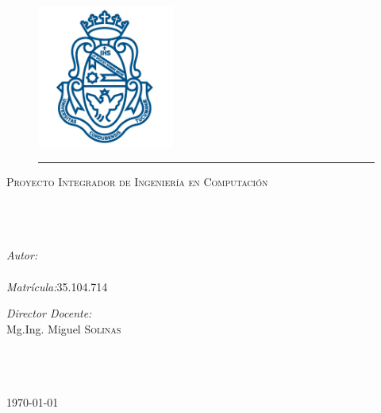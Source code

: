 \documentclass[11pt, oneside]{Thesis} %
\begin{document}
\begin{titlepage}
\begin{center}
\textsc{\LARGE \univname}\\[1.5cm] %


\begin{figure}[htbp]
	\centering
		\includegraphics[width=0.4\textwidth]{Figures/logo.png}
		\rule{35em}{0.5pt}
\end{figure}


\textsc{\Large Proyecto Integrador de Ingeniería en Computación}\\[0.5cm] %

\HRule \\[0.4cm] %
{\huge \bfseries \ttitle}\\[0.4cm] %
\HRule \\[1cm] %
 
\begin{minipage}[t]{0.4\textwidth}
\begin{flushleft} \large
\emph{Autor:}\\
{\authornames}\\ %
\emph{Matrícula:}35.104.714
\end{flushleft}
\end{minipage}
\begin{minipage}[t]{0.4\textwidth}
\begin{flushright} \large
\emph{Director Docente:} 
\\{Mg.Ing. Miguel \textsc{Solinas} }\\ %
\end{flushright}
\end{minipage}

\facname\\\groupname\\~\\ %
 
{\large \today}\\ %
\vfill
\end{center}
\end{titlepage}
\end{document}
